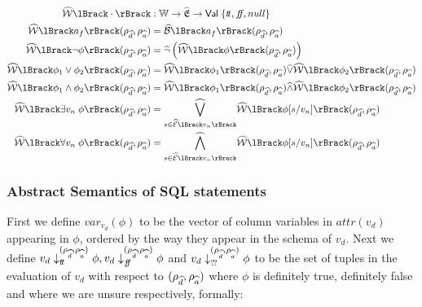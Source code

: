 \begin{align}
    \abspredsem{\cdot} &: \mathbb{W} \rightarrow \ab{\mathfrak{E}} \rightarrow \mathsf{Val} \; \{\true, \false, \mnull\} \\ \label{eq:atomicformulas}
    \abspredsem{a_f}(\rho_{\ab{d}}, \rho_{\ab{a}}) &= \absboolsem{a_f}(\rho_{\ab{d}}, \rho_{\ab{a}}) \\
    \abspredsem{\neg \phi}(\rho_{\ab{d}}, \rho_{\ab{a}}) &= \ab{\neg} \left( \abspredsem{\phi}(\rho_{\ab{d}}, \rho_{\ab{a}}) \right) \\
    \abspredsem{\phi_1 \lor \phi_2}(\rho_{\ab{d}}, \rho_{\ab{a}}) &= \abspredsem{\phi_1}(\rho_{\ab{d}}, \rho_{\ab{a}}) \ab{\lor} \abspredsem{\phi_2}(\rho_{\ab{d}}, \rho_{\ab{a}}) \\
    \abspredsem{\phi_1 \land \phi_2}(\rho_{\ab{d}}, \rho_{\ab{a}}) &= \abspredsem{\phi_1}(\rho_{\ab{d}}, \rho_{\ab{a}}) \ab{\land} \abspredsem{\phi_2}(\rho_{\ab{d}}, \rho_{\ab{a}}) \\
    \abspredsem{\exists v_n \; \phi}(\rho_{\ab{d}}, \rho_{\ab{a}}) &= \underset{s \in \absexpsem{v_n}}{\ab{\bigvee}} \abspredsem{\phi[s/v_n]}(\rho_{\ab{d}}, \rho_{\ab{a}}) \\
    \abspredsem{\forall v_n \; \phi}(\rho_{\ab{d}}, \rho_{\ab{a}}) &= \underset{s \in \absexpsem{v_n}}{\ab{\bigwedge}} \abspredsem{\phi[s/v_n]}(\rho_{\ab{d}}, \rho_{\ab{a}})
\end{align}

\subsubsection{Abstract Semantics of SQL statements}

First we define $var_{v_d}(\phi)$ to be the vector of column variables in $attr(v_d)$ appearing in $\phi$, ordered by the way they appear in the schema of $v_d$.
Next we define $v_d \downarrow_{t\!t}^{(\rho_{\widehat{d}}, \rho_{\widehat{a}})} \phi, v_d \downarrow_{f\!\!f}^{(\rho_{\widehat{d}}, \rho_{\widehat{a}})} \phi$ and  $v_d \downarrow_{?\!?}^{(\rho_{\widehat{d}}, \rho_{\widehat{a}})} \phi$ to be the set of tuples in the evaluation of $v_d$ with respect to $(\rho_{\widehat{d}}, \rho_{\widehat{a}})$ where $\phi$ is definitely true, definitely false and where we are unsure respectively, formally:

